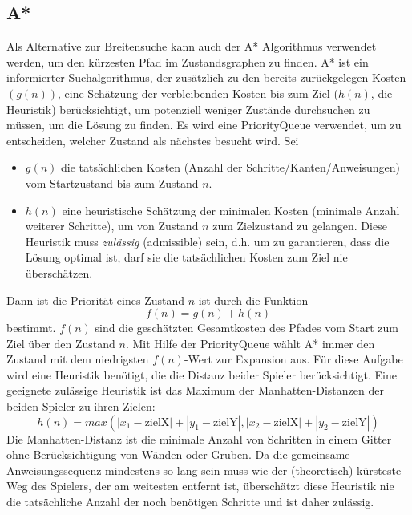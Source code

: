 \documentclass[a4paper,10pt,ngerman]{scrartcl}
\begin{document}
\subsection{A*}
Als Alternative zur Breitensuche kann auch der A* Algorithmus verwendet werden, um den kürzesten Pfad im Zustandsgraphen zu finden. A* ist ein informierter Suchalgorithmus, der zusätzlich zu den bereits zurückgelegen Kosten $(g(n))$, eine Schätzung der verbleibenden Kosten bis zum Ziel ($h(n)$, die Heuristik) berücksichtigt, um potenziell weniger Zustände durchsuchen zu müssen, um die Lösung zu finden.  
\newline
Es wird eine PriorityQueue verwendet, um zu entscheiden, welcher Zustand als nächstes besucht wird. Sei 
\begin{itemize}
  \item $g(n)$ die tatsächlichen Kosten (Anzahl der Schritte/Kanten/Anweisungen) vom Startzustand bis zum Zustand $n$. 
  \item $h(n)$ eine heuristische Schätzung der minimalen Kosten (minimale Anzahl weiterer Schritte), um von Zustand $n$ zum Zielzustand zu gelangen. Diese Heuristik muss \textit{zulässig} (admissible) sein, d.h. um zu garantieren, dass die Lösung optimal ist, darf sie die tatsächlichen Kosten zum Ziel nie überschätzen.  
\end{itemize}
Dann ist die Priorität eines Zustand $n$ ist durch die Funktion 
\begin{equation}
  f(n) = g(n) + h(n) 
  \label{1}
\end{equation}
bestimmt. $f(n)$ sind die geschätzten Gesamtkosten des Pfades vom Start zum Ziel über den Zustand $n$. Mit Hilfe der PriorityQueue wählt A* immer den Zustand mit dem niedrigsten $f(n)$-Wert zur Expansion aus.  
Für diese Aufgabe wird eine Heuristik benötigt, die die Distanz beider Spieler berücksichtigt. Eine geeignete zulässige Heuristik ist das Maximum der Manhatten-Distanzen der beiden Spieler zu ihren Zielen:
\begin{equation}
  h(n) = max( |x_1 - \text{zielX}| + |y_1 - \text{zielY}|, |x_2 - \text{zielX}| + |y_2 - \text{zielY}| ) 
  \label{2}
\end{equation}
Die Manhatten-Distanz ist die minimale Anzahl von Schritten in einem Gitter ohne Berücksichtigung von Wänden oder Gruben. Da die gemeinsame Anweisungssequenz mindestens so lang sein muss wie der (theoretisch) kürsteste Weg des Spielers, der am weitesten entfernt ist, überschätzt diese Heuristik nie die tatsächliche Anzahl der noch benötigen Schritte und ist daher zulässig.
\end{document}
